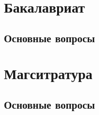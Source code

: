 \documentclass[a4paper,russian]{article}
\begin{document}
\setlength{\parindent}{0in}

\section{Бакалавриат}
\subsection{Основные вопросы}


\section{Магситратура}
\subsection{Основные вопросы}

\end{document}
